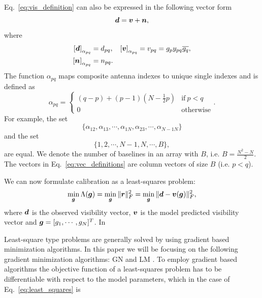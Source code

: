 \documentclass[useAMS,usenatbib]{mn2e}
\newcommand{\br}{\bmath{r}}
\newcommand{\bg}{\bmath{g}}
\newcommand{\bd}{\bmath{d}}
\newcommand{\bv}{\bmath{v}}
\newcommand{\bn}{\bmath{n}}
\newcommand{\conj}[1]{\overline{#1}}
\begin{document}
Eq.~\eqref{eq:vis_definition} can also be expressed in the following vector form 
\begin{equation}
\label{eq:vis_definition}
\bd = \bv + \bn, 
\end{equation}
where 
\begin{align}
 \left [ \bd \right]_{\alpha_{pq}} &= d_{pq}, & \left [ \bv \right ]_{\alpha_{pq}} &= v_{pq}=g_p y_{pq} \conj{g_q},\nonumber\\
 \left [ \bn \right ]_{\alpha_{pq}} &= n_{pq}. &  &\label{eq:vec_definitions}
\end{align}
The function $\alpha_{pq}$ maps composite antenna indexes to unique single indexes and is defined as
\begin{equation}
\alpha_{pq} =
\begin{cases}
(q-p) + (p-1)\left (N-\frac{1}{2}p \right ) & \textrm{if}~p<q\\
0 & \textrm{otherwise}
\end{cases}.
\end{equation}
For example, the set
\begin{equation}
\{\alpha_{12},\alpha_{13},\cdots,\alpha_{1N},\alpha_{23},\cdots,\alpha_{N-1N}\}
\end{equation}
and the set
\begin{equation}
\{1,2,\cdots,N-1,N,\cdots,B\},
\end{equation}
are equal. We denote the number of baselines in an array with $B$, i.e. $B = \frac{N^2-N}{2}$. The vectors in Eq.~\eqref{eq:vec_definitions} are column vectors of size $B$ (i.e. $p<q$).

We can now formulate calibration as a least-squares problem:
\begin{equation}
\label{eq:least_squares}
\min_{\bg} \Lambda(\bg) = \min_{\bg} \|\br\|_F^2 = \min_{\bg} \|\bd - \bv(\bg)\|_F^2, 
\end{equation}
where $\bd$ is the observed visibility vector, $\bv$ is the model predicted visibility vector and $\bg =[g_1,\cdots,g_N]^T$.
In 


Least-square type problems are generally solved by using gradient based minimization algorithms. In this paper we will be focusing on the following gradient minimization algorithms: GN and LM \citep{Levenberg1944,Marquardt1963}.
To employ gradient based algorithms the objective function of a least-squares problem has to be differentiable with respect to the model parameters, which in the case of 
Eq.~\ref{eq:least_squares} is 
\end{document}
